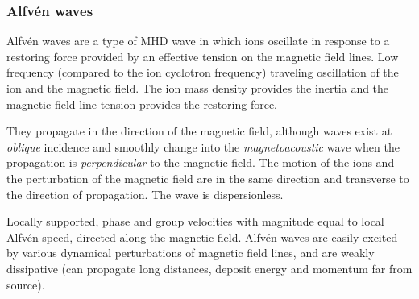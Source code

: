 \documentclass{article}
\begin{document}
\subsubsection{Alfv\'en waves}
Alfv\'en waves are a type of MHD wave in which ions oscillate in response to a
restoring force provided by an effective tension on the magnetic field lines.
Low frequency (compared to the ion cyclotron frequency) traveling
oscillation of the ion and the magnetic field. The ion mass
density provides the inertia and the magnetic field line
tension provides the restoring force.

They propagate in the direction of the magnetic field, although waves exist
at \emph{oblique} incidence and smoothly change into the \emph{magnetoacoustic}
wave when the propagation is \emph{perpendicular} to the magnetic field.
The motion of the ions and the perturbation of the magnetic
field are in the same direction and transverse to the direction of
propagation. The wave is dispersionless.

Locally supported, phase and group velocities with magnitude equal to
local Alfv\'en speed, directed along the magnetic field.
Alfv\'en waves are easily excited by various dynamical perturbations of
magnetic field lines, and are
weakly dissipative (can propagate long distances, deposit energy
and momentum far from source).
\end{document}
